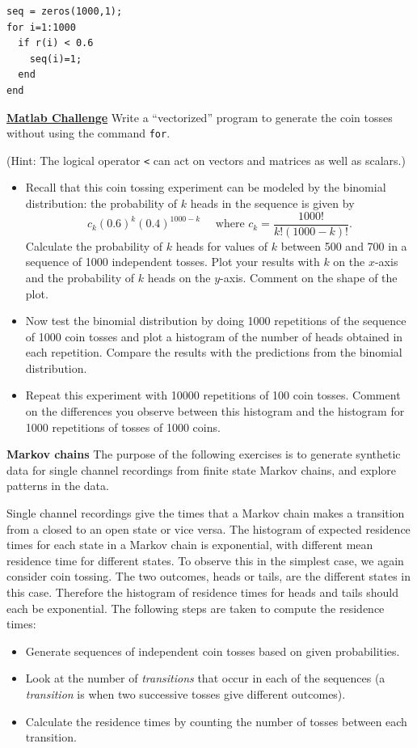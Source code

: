 \documentclass [11pt]{article}
\newcounter{exercise}
\numberwithin{exercise}{section}
\begin{document}
\begin{verbatim}
seq = zeros(1000,1);
for i=1:1000
  if r(i) < 0.6
    seq(i)=1;
  end
end
\end{verbatim}

\textbf{\underline{Matlab Challenge}} Write a ``vectorized'' program 
to generate the coin tosses without using the command \texttt{for}.

(Hint: The logical operator \texttt{<} can act on vectors and matrices
as well as scalars.)

\begin{itemize} 
\item Recall that this coin tossing experiment can be modeled by
the binomial distribution: the probability of $k$
heads in the sequence is given by 
$$c_k (0.6)^k (0.4)^{1000-k} \quad \mbox{ where } c_k=\frac{1000!}{k!(1000-k)!}.$$ 
Calculate the probability of $k$ heads for 
values of $k$ between 500 and 700 in a sequence of 1000
independent tosses.  Plot your results with $k$ on the 
$x$-axis and the probability of $k$ heads on the $y$-axis.
Comment on the shape of the plot. 
\item Now test the binomial distribution by doing 1000 repetitions of the sequence of 1000 coin tosses and plot
a histogram of the number of heads obtained in each repetition. 
Compare the results with the predictions from the binomial distribution. 
\item Repeat this experiment with 10000 repetitions of 100
coin tosses. Comment on the differences you observe between this
histogram and the histogram for 1000 repetitions of tosses of 1000 coins.
\end{itemize}

\textbf{Markov chains} 
The purpose of the following exercises is to generate synthetic data for 
single channel recordings from finite state Markov chains, and explore patterns in the data. 

Single channel recordings give the times that a Markov chain makes a transition from a closed to an open
state or vice versa. The histogram of expected residence times 
for each state in a Markov chain is exponential, with different mean residence time for different states.  
To observe this in the simplest case, we again consider coin tossing. The two outcomes, heads or
tails, are the different states in this case. Therefore the histogram of residence times for heads and tails should 
each be exponential. The following steps are taken to compute the residence times:

\begin{itemize}
\item Generate sequences of independent coin tosses based on given 
probabilities.
\item Look at the number of \emph{transitions} that occur in
each of the sequences (a \emph{transition} is when two successive tosses give different 
outcomes).
\item Calculate the residence times by counting the
number of tosses between each transition. \end{itemize}
\end{document}
